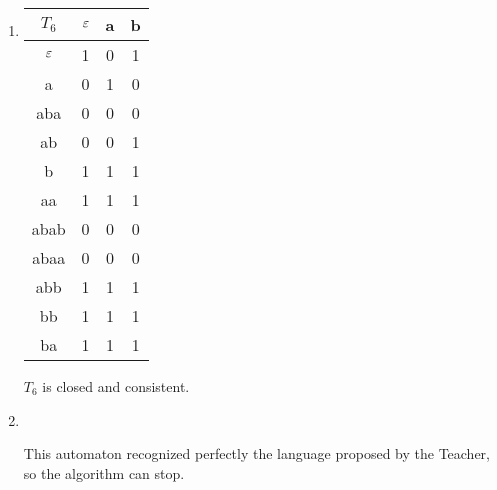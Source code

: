 \begin{enumerate}
  \item \begin{minipage}{0.3\textwidth}
          \begin{tabular}{c||c|c|c}
            $T_6$ & $\varepsilon$ & a & b \\
            \hline\hline
            $\varepsilon$  & 1    & 0 & 1 \\
            a     & 0    & 1 & 0 \\
            aba   & 0    & 0 & 0 \\
            ab    & 0    & 0 & 1 \\
            b     & 1    & 1 & 1 \\
            \hline\hline
            aa    & 1    & 1 & 1 \\
            abab  & 0    & 0 & 0 \\
            abaa  & 0    & 0 & 0 \\
            abb   & 1    & 1 & 1 \\
            bb    & 1    & 1 & 1 \\
            ba    & 1    & 1 & 1 \\
          \end{tabular}
        \end{minipage} \quad
        \begin{minipage}{0.5\textwidth}
          $T_6$ is closed and consistent.
        \end{minipage}

  \item \begin{minipage}{0.3\textwidth}
          
        \end{minipage}\quad\\
        \begin{minipage}{0.6\textwidth}
          This automaton recognized perfectly the language proposed by the Teacher, so the algorithm can stop.
        \end{minipage}
\end{enumerate}